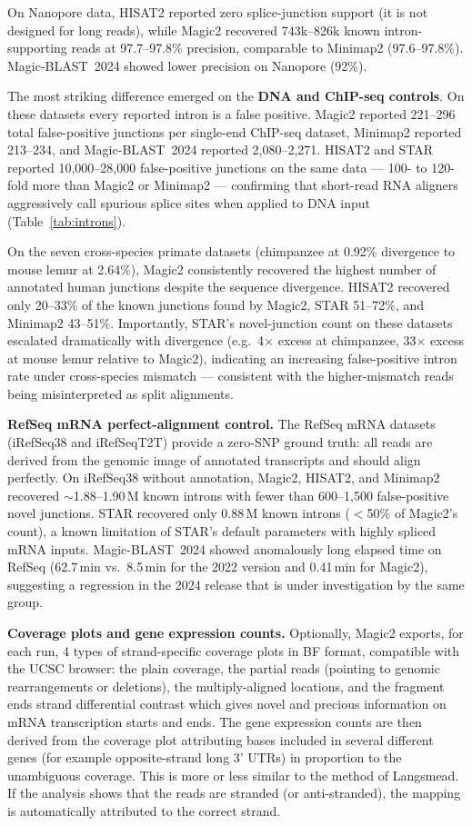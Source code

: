 \documentclass[11pt]{article}
\begin{document}
On Nanopore data, HISAT2 reported zero splice-junction support (it is
not designed for long reads), while Magic2 recovered 743k--826k
known intron-supporting reads at 97.7--97.8\% precision, comparable
to Minimap2 (97.6--97.8\%).
Magic-BLAST~2024 showed lower precision on Nanopore (92\%).

The most striking difference emerged on the \textbf{DNA and ChIP-seq
controls}.
On these datasets every reported intron is a false positive.
Magic2 reported 221--296 total false-positive junctions per
single-end ChIP-seq dataset, Minimap2 reported 213--234, and
Magic-BLAST~2024 reported 2,080--2,271.
HISAT2 and STAR reported 10,000--28,000 false-positive junctions on
the same data — 100- to 120-fold more than Magic2 or Minimap2 — confirming that
short-read RNA aligners aggressively call spurious splice sites when
applied to DNA input
(Table~\ref{tab:introns}).

On the seven cross-species primate datasets (chimpanzee at 0.92\%
divergence to mouse lemur at 2.64\%), Magic2 consistently recovered
the highest number of annotated human junctions despite the sequence
divergence.
HISAT2 recovered only 20--33\% of the known junctions found by Magic2,
STAR 51--72\%, and Minimap2 43--51\%.
Importantly, STAR's novel-junction count on these datasets escalated
dramatically with divergence (e.g.\ 4$\times$ excess at chimpanzee,
33$\times$ excess at mouse lemur relative to Magic2), indicating an
increasing false-positive intron rate under cross-species mismatch —
consistent with the higher-mismatch reads being misinterpreted as
split alignments.

\medskip\noindent\textbf{RefSeq mRNA perfect-alignment control.}\quad
The RefSeq mRNA datasets (iRefSeq38 and iRefSeqT2T) provide a
zero-SNP ground truth: all reads are derived from the genomic image
of annotated transcripts and
should align perfectly.
On iRefSeq38 without annotation, Magic2, HISAT2, and Minimap2
recovered $\sim$1.88--1.90\,M known introns with fewer than
600--1,500 false-positive novel junctions.
STAR recovered only 0.88\,M known introns ($<$50\% of Magic2's count),
a known limitation of STAR's default parameters with highly spliced
mRNA inputs.
Magic-BLAST~2024 showed anomalously long elapsed time on RefSeq
(62.7\,min vs.\ 8.5\,min for the 2022 version and 0.41\,min for
Magic2), suggesting a regression in the 2024 release that is under
investigation by the same group.

\medskip\noindent\textbf{Coverage plots and gene expression counts.}\quad
Optionally, Magic2 exports, for each run, 4 types of strand-specific coverage plots in BF format, compatible
with the UCSC browser: the plain coverage, the partial reads (pointing to
genomic rearrangements or deletions), the multiply-aligned locations, and the
fragment ends strand differential contrast which gives novel and
precious information on mRNA transcription starts and ends.
The gene expression counts are then derived from the coverage plot
attributing bases included in several different genes (for example opposite-strand
long 3' UTRs) in proportion to the unambiguous coverage.
This is more or less similar to the method of Langsmead.
If the analysis shows that the reads are stranded (or anti-stranded),
the mapping is automatically attributed to the correct strand.
\end{document}
